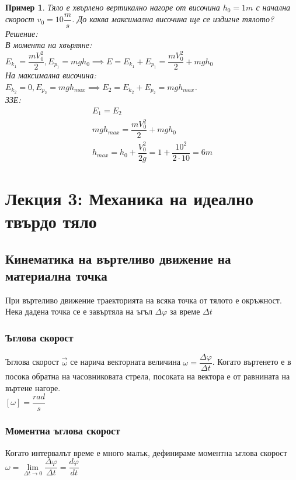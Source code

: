 \documentclass[fleqn, 12pt]{article}
\newtheorem{example}{Пример}[subsection]
\begin{document}
\begin{example}
Тяло е хвърлено вертикално нагоре от височина $h_0 =  1m$ с начална скорост $v_0 = 10 \dfrac{m}{s}$. До каква максимална височина ще се издигне тялото?\\
Решение:\\
В момента на хвърляне: \\
$E_{k_1} = \dfrac{mV_0^2}{2}, E_{p_1} = mgh_0 \implies E = E_{k_1} + E_{p_1} =  \dfrac{mV_0^2}{2} + mgh_0 $ \\
На максимална височина: \\
$E_{k_2} = 0 , E_{p_2} = mgh_{max} \implies E_2 = E_{k_2} + E_{p_2} =  mgh_{max} $. \\
ЗЗЕ: 
\begin{gather*}
E_1 = E_2\\
mgh_{max} = \dfrac{mV_0^2}{2} + mgh_0  \\
h_{max} = h_0 + \dfrac{V_0^2}{2g} = 1 + \dfrac{10^2}{2 \cdot 10} = 6m
\end{gather*}
\end{example}


\newpage
\section{Лекция 3: Механика на идеално твърдо тяло}

\subsection{Кинематика на въртеливо движение на материална точка}
При въртеливо движение траекторията на всяка точка от тялото е окръжност. Нека дадена точка се е завъртяла на ъгъл $\Delta \varphi$
за време $\Delta t$

\subsubsection{Ъглова скорост}
Ъглова скорост $\vec{\omega}$ се нарича векторната величина $\omega = \dfrac{\Delta \varphi}{\Delta t}$. Когато въртенето е в посока обратна на часовниковата стрела, посоката на вектора е от равнината на въртене нагоре. \\
$\left[ \omega \right] = \dfrac{rad}{s}$

\subsubsection{Моментна ъглова скорост}
Когато интервалът време е много малък, дефинираме моментна ъглова скорост $\omega = \lim\limits_{\Delta t \rightarrow 0} \dfrac{\Delta \varphi}{\Delta t} = \dfrac{d \varphi}{dt}$
\end{document}
